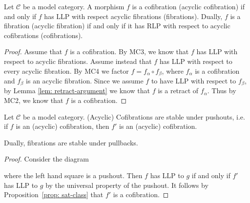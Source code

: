 \documentclass[../thesis.tex]{subfiles}
\begin{document}
            \begin{proposition}\label{prop: sat-class}
                Let $\mathcal{C}$ be a model category. A morphism $f$ is a cofibration (acyclic cofibration) if and only if $f$ has LLP with respect acyclic fibrations (fibrations). Dually, $f$ is a fibration (acyclic fibration) if and only if it has RLP with respect to acyclic cofibrations (cofibrations).
            \end{proposition}

            \begin{proof}
            Assume that $f$ is a cofibration. By MC3, we know that $f$ has LLP with respect to acyclic fibrations. Assume instead that $f$ has LLP with respect to every acyclic fibration. By MC4 we factor $f = f_\alpha\circ f_\beta$, where $f_\alpha$ is a cofibration and $f_\beta$ is an acyclic fibration. Since we assume $f$ to have LLP with respect to $f_\beta$, by Lemma \ref{lem: retract-argument} we know that $f$ is a retract of $f_\alpha$. Thus by MC2, we know that $f$ is a cofibration. 
            \end{proof}

            \begin{corollary}\label{cor: stable-cofib-base-change}
                Let $\mathcal{C}$ be a model category. (Acyclic) Cofibrations are stable under pushouts, i.e. if $f$ is an (acyclic) cofibration, then $f'$ is an (acyclic) cofibration.
                \begin{center}
                \end{center}
                Dually, fibrations are stable under pullbacks.
            \end{corollary}

            \begin{proof}
                Consider the diagram
                \begin{center}
                \end{center}
                where the left hand square is a pushout. Then $f$ has LLP to $g$ if and only if $f'$ has LLP to $g$ by the universal property of the pushout. It follows by Proposition~\ref{prop: sat-class} that $f'$ is a cofibration.
            \end{proof}
\end{document}

